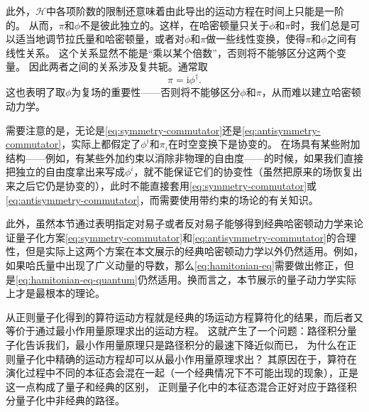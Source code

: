 \documentclass[hyperref, UTF8, a4paper]{ctexart}
\newcommand*{\ii}{\mathrm{i}}
\begin{document}
此外，$\mathcal{H}$中各项阶数的限制还意味着由此导出的运动方程在时间上只能是一阶的。
从而，$\pi$和$\phi$不是彼此独立的。这样，在哈密顿量只关于$\phi$和$\pi$时，我们总是可以适当地调节拉氏量和哈密顿量，或者对$\phi$和$\pi$做一些线性变换，使得$\pi$和$\phi$之间有线性关系。
这个关系显然不能是“乘以某个倍数”，否则将不能够区分这两个变量。
因此两者之间的关系涉及复共轭。通常取
\begin{equation}
    \pi = \ii \phi^\dagger.
\end{equation}
这也表明了取$\phi$为复场的重要性——否则将不能够区分$\phi$和$\pi$，从而难以建立哈密顿动力学。

需要注意的是，无论是\eqref{eq:symmetry-commutator}还是\eqref{eq:antisymmetry-commutator}，实际上都假定了$\phi^i$和$\pi_i$在时空变换下是协变的。
在场具有某些附加结构——例如，有某些外加约束以消除非物理的自由度——的时候，如果我们直接把独立的自由度拿出来写成$\phi^i$，就不能保证它们的协变性（虽然把原来的场恢复出来之后它仍是协变的），此时不能直接套用\eqref{eq:symmetry-commutator}或\eqref{eq:antisymmetry-commutator}，而需要使用带约束的场论的有关知识。

此外，虽然本节通过表明指定对易子或者反对易子能够得到经典哈密顿动力学来论证量子化方案\eqref{eq:symmetry-commutator}和\eqref{eq:antisymmetry-commutator}的合理性，但是实际上这两个方案在本文展示的经典哈密顿动力学以外仍然适用。例如，如果哈氏量中出现了广义动量的导数，那么\eqref{eq:hamitonian-eq}需要做出修正，但是\eqref{eq:hamitonian-eq-quantum}仍然适用。换而言之，本节展示的量子动力学实际上才是最根本的理论。

从正则量子化得到的算符运动方程就是经典的场运动方程算符化的结果，而后者又等价于通过最小作用量原理求出的运动方程。
这就产生了一个问题：路径积分量子化告诉我们，最小作用量原理只是路径积分的最速下降近似而已，
为什么在正则量子化中精确的运动方程却可以从最小作用量原理求出？
其原因在于，算符在演化过程中不同的本征态会混在一起（一个经典情况下不可能出现的现象），正是这一点构成了量子和经典的区别，
正则量子化中的本征态混合正好对应于路径积分量子化中非经典的路径。
\end{document}
